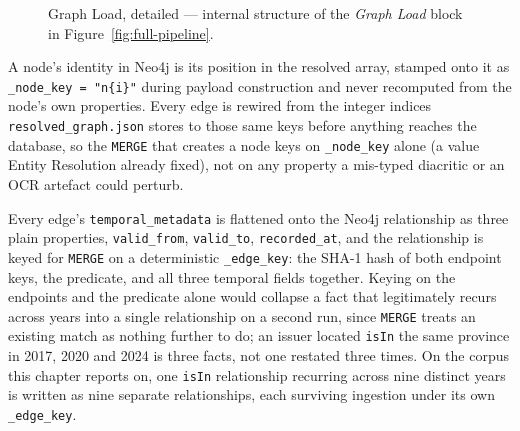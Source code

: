 \documentclass[fontsize=12pt,oneside,headings=small]{scrreprt}
\begin{document}
\begin{figure}[H]
{%
  }
  \caption[Graph Load, detailed]{Graph Load, detailed --- internal structure
    of the \emph{Graph Load} block in Figure~\ref{fig:full-pipeline}.}
  \label{fig:graph-load-detail}
\end{figure}

A node's identity in Neo4j is its position in the resolved array, stamped onto it as \texttt{\_node\_key = "n\{i\}"} during payload construction and never recomputed from the node's own properties. Every edge is rewired from the integer indices \texttt{resolved\_graph.json} stores to those same keys before anything reaches the database, so the \texttt{MERGE} that creates a node keys on \texttt{\_node\_key} alone (a value Entity Resolution already fixed), not on any property a mis-typed diacritic or an OCR artefact could perturb.

Every edge's \texttt{temporal\_metadata} is flattened onto the Neo4j relationship as three plain properties, \texttt{valid\_from}, \texttt{valid\_to}, \texttt{recorded\_at}, and the relationship is keyed for \texttt{MERGE} on a deterministic \texttt{\_edge\_key}: the SHA-1 hash of both endpoint keys, the predicate, and all three temporal fields together. Keying on the endpoints and the predicate alone would collapse a fact that legitimately recurs across years into a single relationship on a second run, since \texttt{MERGE} treats an existing match as nothing further to do; an issuer located \texttt{isIn} the same province in 2017, 2020 and 2024 is three facts, not one restated three times. On the corpus this chapter reports on, one \texttt{isIn} relationship recurring across nine distinct years is written as nine separate relationships, each surviving ingestion under its own \texttt{\_edge\_key}.
\end{document}
